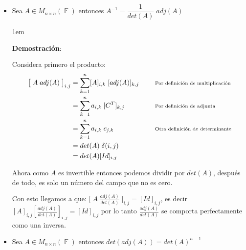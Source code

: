 \documentclass[12pt, fleqn]{article}                             %
\newenvironment{SmallIndentation}[1][0.75em]                    %
        {\begin{adjustwidth}{#1}{}\begin{footnotesize}}             %
        {\end{footnotesize}\end{adjustwidth}}                       %
\DeclareMathOperator \Space {\quad}                             %
\newcommand \Remember[1]{\Space\text{\scriptsize{#1}}}          %
\theoremstyle{break}                                            %
\DeclareMathOperator \GenericField {\mathbb{F}}                 %
\newcommand{\Brackets}[1]    {\left[ #1 \right]}                %
\newcommand{\bigBrackets}[1] {\big[ \; #1 \; \big]}             %
\begin{document}
    \begin{itemize}

        \item
            Sea $A \in M_{n \times n}(\GenericField)$ entonces
            $A^{-1} = \dfrac{1}{det(A)} \; adj(A)$

            \begin{SmallIndentation}[1em]
                \textbf{Demostración}:
                
                Considera primero el producto:
                \begin{align*}
                    \bigBrackets{A \; adj(A)}_{i, j}
                        &= \sum_{k = 1}^n 
                            [A]_{i, k} \; [adj(A)]_{k, j}       
                            && \Remember{Por definición de multiplicación}  \\
                        &= \sum_{k = 1}^n 
                            a_{i, k} \; [C^T]_{k, j}       
                            && \Remember{Por definición de adjunta}         \\
                        &= \sum_{k = 1}^n 
                            a_{i, k} \; c_{j, k}       
                            && \Remember{Otra definición de determinante}   \\
                        &= det(A) \; \delta(i, j)                           \\
                        &= det(A) [Id]_{i, j}                               \\
                \end{align*}

                Ahora como $A$ es invertible entonces podemos dividir por
                $det(A)$, después de todo, es solo un número del campo
                que no es cero.

                Con esto llegamos a que:
                $\bigBrackets{A \; \frac{adj(A)}{det(A)} }_{i, j} = [Id]_{i, j}$,
                es decir 
                $[A]_{i, j} \Brackets{ \frac{adj(A)}{det(A)} }_{i, j} = [Id]_{i, j}$
                por lo tanto $\frac{adj(A)}{det(A)}$ se comporta perfectamente como
                una inversa.
            
            \end{SmallIndentation}

        \item
            Sea $A \in M_{n \times n}(\GenericField)$ entonces
            $det( adj(A) ) = det(A)^{n-1}$


\end{itemize}
\end{document}
